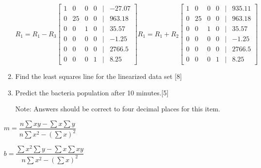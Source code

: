 \documentclass[11pt]{article}
\begin{document}
\begin{enumerate}
\begin{enumerate}
\[
    R_1 = R_1 - R_3
    \begin{bmatrix}
        1 & 0 & 0 & 0 &|& -27.07 \\
        0 & 25 & 0 & 0 &|& 963.18 \\
        0 & 0 & 1 & 0 &|& 35.57 \\
        0 & 0 & 0 & 0 &|& -1.25 \\
        0 & 0 & 0 & 0 &|& 2766.5 \\
        0 & 0 & 0 & 1 &|& 8.25
    \end{bmatrix}
    R_1 = R_1 + R_2
    \begin{bmatrix}
        1 & 0 & 0 & 0 &|& 935.11 \\
        0 & 25 & 0 & 0 &|& 963.18 \\
        0 & 0 & 1 & 0 &|& 35.57 \\
        0 & 0 & 0 & 0 &|& -1.25 \\
        0 & 0 & 0 & 0 &|& 2766.5 \\
        0 & 0 & 0 & 1 &|& 8.25
    \end{bmatrix}
\]



\item Find the least squares line for the linearized data set \hfill[8]

\item Predict the bacteria population after 10 minutes.\hfill[5]


Note: Answers should be correct to four decimal places for this item.

\end{enumerate}

\begin{center}
$m=\dfrac{n\sum xy -\sum x\sum y}{n\sum x^2 -(\sum x)^2}$

$b=\dfrac{\sum x^2\sum y - \sum x\sum xy}{n\sum x^2 -(\sum x)^2}$

\end{center}



\end{enumerate}
\end{document}
